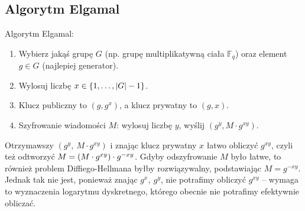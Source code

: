 \subsection{Algorytm Elgamal}
\begin{greyframe}
    Algorytm Elgamal:
    \begin{enumerate}
        \item Wybierz jakąś grupę \( G \) (np. grupę multiplikatywną ciała \( \mathbb{F}_q \)) oraz element \( g \in G \) (najlepiej generator).
        \item Wylosuj liczbę \( x \in \set{1, \ldots, \abs{G}-1} \).
        \item Klucz publiczny to \( (g,g^x) \), a klucz prywatny to \( (g,x) \).
        \item Szyfrowanie wiadomości \( M \): wylosuj liczbę \( y \), wyślij \( (g^y, M \cdot g^{xy}) \). 
    \end{enumerate}
\end{greyframe}
Otrzymawszy \( (g^y, \ M \cdot g^{xy}) \) i znając klucz prywatny \( x \) łatwo obliczyć \( g^{xy} \), czyli też odtworzyć \( M = \left(M \cdot g^{xy}\right) \cdot g^{-xy} \).
Gdyby odszyfrowanie \( M \) było łatwe, to również problem Diffiego-Hellmana byłby rozwiązywalny, podstawiając \( M = g^{-xy} \).
Jednak tak nie jest, ponieważ znając \( g^x, \ g^y \), nie potrafimy obliczyć \( g^{xy} \) -- wymaga to wyznaczenia logarytmu dyskretnego, którego obecnie nie potrafimy efektywnie obliczać.